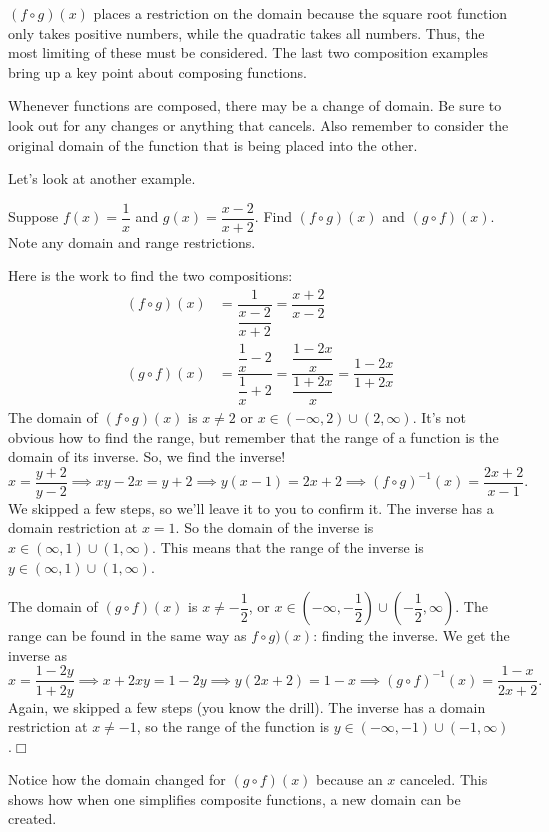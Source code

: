 \documentclass[../book.tex]{subfiles}
\begin{document}
$(f\circ g)(x)$ places a restriction on the domain because the square root function only takes positive numbers, while the quadratic takes all numbers.  Thus, the most limiting of these must be considered.  The last two composition examples bring up a key point about composing functions.  
\begin{note}
Whenever functions are composed, there may be a change of domain.  Be sure to look out for any changes or anything that cancels.  Also remember to consider the original domain of the function that is being placed into the other.
\end{note}
Let's look at another example.
\begin{example}
Suppose $f(x)=\dfrac{1}{x}$ and $g(x)=\dfrac{x-2}{x+2}$.  Find $(f\circ g)(x)$ and $(g\circ f)(x)$.  Note any domain and range restrictions.
\end{example}
\begin{solution}
Here is the work to find the two compositions:\begin{align*}
    (f\circ g)(x)&=\dfrac{1}{\dfrac{x-2}{x+2}}=\dfrac{x+2}{x-2} \\
    (g\circ f)(x)&=\dfrac{\dfrac{1}{x}-2}{\dfrac{1}{x}+2}=\dfrac{\dfrac{1-2x}{x}}{\dfrac{1+2x}{x}}=\dfrac{1-2x}{1+2x}
\end{align*}
The domain of $(f\circ g)(x)$ is $x\neq 2$ or $x\in(-\infty,2)\cup(2,\infty)$.  It's not obvious how to find the range, but remember that the range of a function is the domain of its inverse.  So, we find the inverse! $$x=\dfrac{y+2}{y-2} \implies xy-2x=y+2\implies y(x-1)=2x+2 \implies (f\circ g)^{-1}(x)=\dfrac{2x+2}{x-1}.$$  We skipped a few steps, so we'll leave it to you to confirm it.  The inverse has a domain restriction at $x=1$.  So the domain of the inverse is $x\in(\infty,1)\cup(1,\infty)$.  This means that the range of the inverse is $y\in(\infty,1)\cup(1,\infty)$.

The domain of $(g\circ f)(x)$ is $x\neq-\dfrac{1}{2}$, or $x\in\left(-\infty,-\dfrac{1}{2}\right)\cup\left(-\dfrac{1}{2},\infty\right)$.  The range can be found in the same way as $f\circ g)(x)$: finding the inverse.  We get the inverse as $$x=\dfrac{1-2y}{1+2y}\implies x+2xy=1-2y\implies y(2x+2)=1-x \implies (g\circ f)^{-1}(x)=\dfrac{1-x}{2x+2}.$$  Again, we skipped a few steps (you know the drill).  The inverse has a domain restriction at $x\neq -1$, so the range of the function is $y\in(-\infty,-1)\cup(-1,\infty)$.$\Box$
\end{solution}
Notice how the domain changed for $(g\circ f)(x)$ because an $x$ canceled.  This shows how when one simplifies composite functions, a new domain can be created.  
\end{document}
